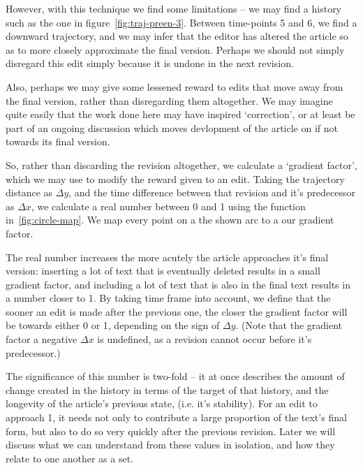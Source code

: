 However, with this technique we find some limitations -- we may find a
history such as the one in figure~\ref{fig:traj-preen-3}. Between
time-points 5 and 6, we find a downward trajectory, and we may infer
that the editor has altered the article so as to more closely
approximate the final version. Perhaps we should not simply disregard
this edit simply because it is undone in the next revision.

Also, perhaps we may give some lessened reward to edits that move away
from the final version, rather than disregarding them altogether. We
may imagine quite easily that the work done here may have inspired
`correction', or at least be part of an ongoing discussion which moves
devlopment of the article on if not towards its final version.

So, rather than discarding the revision altogether, we calculate a
`gradient factor', which we may use to modify the reward given to an
edit. Taking the trajectory distance as $\Delta y$, and the time
difference between that revision and it's predecessor as $\Delta x$,
we calculate a real number between 0 and 1 using the function
in~\ref{fig:circle-map}. We map every point on a the shown arc to a
our gradient factor. 

The real number increases the more acutely the article approaches it's
final version: inserting a lot of text that is eventually deleted
results in a small gradient factor, and including a lot of text that
is also in the final text results in a number closer to 1. By taking
time frame into account, we define that the sooner an edit is made
after the previous one, the closer the gradient factor will be towards
either 0 or 1, depending on the sign of $\Delta y$. (Note that the
gradient factor a negative $\Delta x$ is undefined, as a revision
cannot occur before it's predecessor.)



The significance of this number is two-fold -- it at once describes
the amount of change created in the history in terms of the target of
that history, and the longevity of the article's previous state,
(i.e. it's stability). For an edit to approach 1, it needs not only to
contribute a large proportion of the text's final form, but also to do
so very quickly after the previous revision. Later we will discuss
what we can understand from these values in isolation, and how they
relate to one another as a set. 

